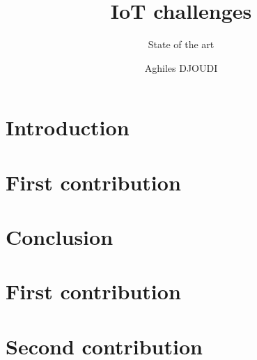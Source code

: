 \documentclass[8pt]{beamer}
\title{IoT challenges}
\subtitle{State of the art}
\author{Aghiles DJOUDI}
\institute{PhD student\\ LIGM/ESIEE Paris \& SIC/ECE Paris}
\begin{document}

\section{Introduction}
	

\tableofcontent

\section{First contribution}
	
	
	
	
	

% 		
% 		
% 		
% 		
% 		

%		
%		
%		
%		
%		

\section{Conclusion}
	


\section{First contribution}
	
	
	
	
	
	

\section{Second contribution}
	
	
	
	
	
	

%		
%		
%		
%		
%		



\frameBibliography
\end{document}
